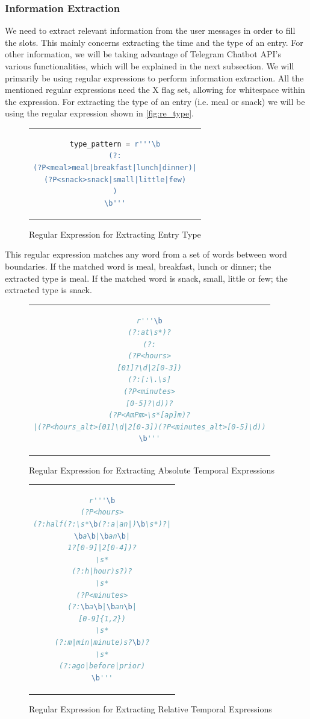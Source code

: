 \subsubsection{Information Extraction}
We need to extract relevant information from the user messages in order to fill the slots.
This mainly concerns extracting the time and the type of an entry.
For other information, we will be taking advantage of Telegram Chatbot API's various functionalities, which will be explained in the next subsection.
We will primarily be using regular expressions to perform information extraction.
All the mentioned regular expressions need the X flag set, allowing for whitespace within the expression.
For extracting the type of an entry (i.e. meal or snack) we will be using the regular expression shown in \autoref{fig:re_type}.

\begin{figure}[htpb]
  \centering
  \begin{tabular}{c}
  \begin{lstlisting}[language=python]
type_pattern = r'''\b
(?:
(?P<meal>meal|breakfast|lunch|dinner)|
(?P<snack>snack|small|little|few)
)
\b'''
  \end{lstlisting}
  \end{tabular}
  \caption[Regular Expression for Extracting Entry Type]{Regular Expression for Extracting Entry Type}
  \label{fig:re_type}
\end{figure}

This regular expression matches any word from a set of words between word boundaries.
If the matched word is meal, breakfast, lunch or dinner; the extracted type is meal.
If the matched word is snack, small, little or few; the extracted type is snack.


\begin{figure}[htpb]
  \centering
  \begin{tabular}{c}
  \begin{lstlisting}[language=python]
r'''\b
(?:at\s*)?
(?:
(?P<hours>
[01]?\d|2[0-3])
(?:[:\.\s]
(?P<minutes>
[0-5]?\d))?
(?P<AmPm>\s*[ap]m)?
|(?P<hours_alt>[01]\d|2[0-3])(?P<minutes_alt>[0-5]\d))
\b'''
  \end{lstlisting}
  \end{tabular}
  \caption[Regular Expression for Extracting Absolute Temporal Expressions]{Regular Expression for Extracting Absolute Temporal Expressions}
  \label{fig:re_time_a}
\end{figure}

\begin{figure}[htpb]
  \centering
  \begin{tabular}{c}
  \begin{lstlisting}[language=python]
r'''\b
(?P<hours>
(?:half(?:\s*\b(?:a|an|)\b\s*)?|
\ba\b|\ban\b|
1?[0-9]|2[0-4])?
\s*
(?:h|hour)s?)?
\s*
(?P<minutes>
(?:\ba\b|\ban\b|
[0-9]{1,2})
\s*
(?:m|min|minute)s?\b)?
\s*
(?:ago|before|prior)
\b'''
  \end{lstlisting}
  \end{tabular}
  \caption[Regular Expression for Extracting Relative Temporal Expressions]{Regular Expression for Extracting Relative Temporal Expressions}
  \label{fig:re_time_r}
\end{figure}

